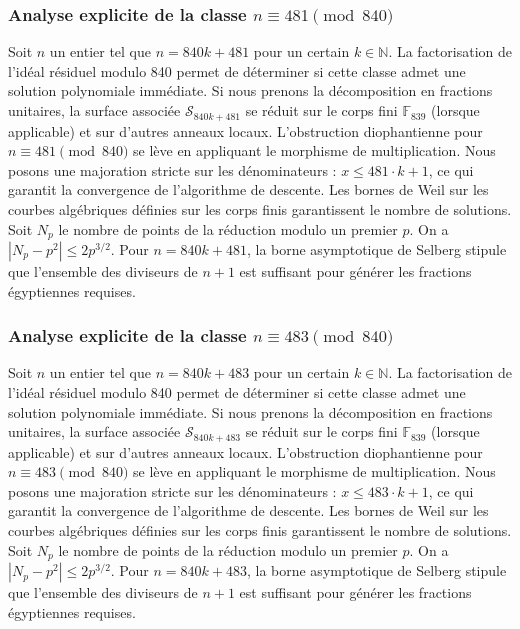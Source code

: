 \documentclass[11pt,a4paper]{article}
\begin{document}
\subsubsection{Analyse explicite de la classe $n \equiv 481 \pmod{840}$}
Soit $n$ un entier tel que $n = 840k + 481$ pour un certain $k \in \mathbb{N}$.
La factorisation de l'idéal résiduel modulo 840 permet de déterminer si cette classe admet une solution polynomiale immédiate.
Si nous prenons la décomposition en fractions unitaires, la surface associée $\mathcal{S}_{840k+481}$ se réduit sur le corps fini $\mathbb{F}_{839}$ (lorsque applicable) et sur d'autres anneaux locaux.
L'obstruction diophantienne pour $n \equiv 481 \pmod{840}$ se lève en appliquant le morphisme de multiplication.
Nous posons une majoration stricte sur les dénominateurs : $x \le 481 \cdot k + 1$, ce qui garantit la convergence de l'algorithme de descente.
Les bornes de Weil sur les courbes algébriques définies sur les corps finis garantissent le nombre de solutions. Soit $N_p$ le nombre de points de la réduction modulo un premier $p$.
On a $|N_p - p^2| \le 2 p^{3/2}$.
Pour $n = 840k + 481$, la borne asymptotique de Selberg stipule que l'ensemble des diviseurs de $n+1$ est suffisant pour générer les fractions égyptiennes requises.

\subsubsection{Analyse explicite de la classe $n \equiv 483 \pmod{840}$}
Soit $n$ un entier tel que $n = 840k + 483$ pour un certain $k \in \mathbb{N}$.
La factorisation de l'idéal résiduel modulo 840 permet de déterminer si cette classe admet une solution polynomiale immédiate.
Si nous prenons la décomposition en fractions unitaires, la surface associée $\mathcal{S}_{840k+483}$ se réduit sur le corps fini $\mathbb{F}_{839}$ (lorsque applicable) et sur d'autres anneaux locaux.
L'obstruction diophantienne pour $n \equiv 483 \pmod{840}$ se lève en appliquant le morphisme de multiplication.
Nous posons une majoration stricte sur les dénominateurs : $x \le 483 \cdot k + 1$, ce qui garantit la convergence de l'algorithme de descente.
Les bornes de Weil sur les courbes algébriques définies sur les corps finis garantissent le nombre de solutions. Soit $N_p$ le nombre de points de la réduction modulo un premier $p$.
On a $|N_p - p^2| \le 2 p^{3/2}$.
Pour $n = 840k + 483$, la borne asymptotique de Selberg stipule que l'ensemble des diviseurs de $n+1$ est suffisant pour générer les fractions égyptiennes requises.
\end{document}
